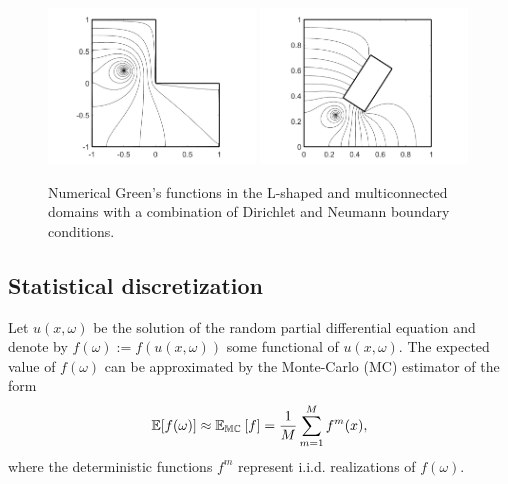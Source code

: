 \begin{figure}[!t]
    \centering
    \includegraphics[width=0.49\textwidth]{GF1}
    \includegraphics[width=0.49\textwidth]{GF2}
	\caption{ Numerical Green's functions in the L-shaped and multiconnected domains with a combination of Dirichlet and Neumann boundary conditions.}
	\label{fig:GF_num}
\end{figure}


\subsection{Statistical discretization}

Let $u(x,\omega)$ be the solution of the random partial differential equation and denote by $f(\omega):=f(u(x,\omega))$ some functional of $u(x,\omega)$.
The expected value of $f(\omega)$ can be approximated by the Monte-Carlo (MC) estimator of the form
\begin{align*}
	\mathbb{E} [ f(\omega) ] 
	\approx 
	\mathbb{E_{MC}}_{{}} \left[ {f} \right] = \frac{1}{M} \sum_{m=1}^M f^m({x}),
\end{align*}
where the deterministic functions $f^m$ represent i.i.d. realizations of $f(\omega)$. 

